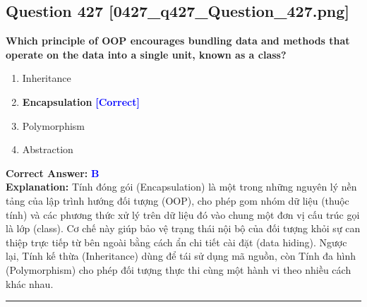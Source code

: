 \documentclass[11pt,a4paper]{article}
\begin{document}
\begin{minipage}{\textwidth}
\subsection*{Question 427 \quad \footnotesize{[0427\_q427\_Question\_427.png]}}
\noindent \textbf{Which principle of OOP encourages bundling data and methods that operate on the data into a single unit, known as a class?}

\begin{enumerate}[label=\Alph*.]
    \item Inheritance
    \item \textbf{Encapsulation} \hfill \textcolor{blue}{\textbf{[Correct]}}
    \item Polymorphism
    \item Abstraction
\end{enumerate}

\noindent \textbf{Correct Answer:} \textcolor{blue}{\textbf{B}} \\[2pt]
\noindent \textbf{Explanation:} Tính đóng gói (Encapsulation) là một trong những nguyên lý nền tảng của lập trình hướng đối tượng (OOP), cho phép gom nhóm dữ liệu (thuộc tính) và các phương thức xử lý trên dữ liệu đó vào chung một đơn vị cấu trúc gọi là lớp (class). Cơ chế này giúp bảo vệ trạng thái nội bộ của đối tượng khỏi sự can thiệp trực tiếp từ bên ngoài bằng cách ẩn chi tiết cài đặt (data hiding). Ngược lại, Tính kế thừa (Inheritance) dùng để tái sử dụng mã nguồn, còn Tính đa hình (Polymorphism) cho phép đối tượng thực thi cùng một hành vi theo nhiều cách khác nhau.

\par\vspace{0.3cm}
\hrule
\vspace{0.3cm}
\end{minipage}
\end{document}
